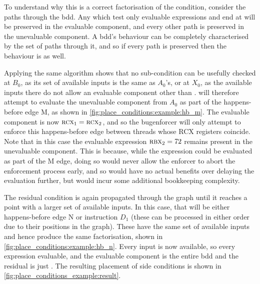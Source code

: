 To understand why this is a correct factorisation of the condition,
consider the paths through the \protect\gls{bdd}.  Any which test only
evaluable expressions and end at \false will be preserved in the
evaluable component, and every other path is preserved in the
unevaluable component.  A \protect\gls{bdd}'s behaviour can be
completely characterised by the set of paths through it, and so if
every path is preserved then the behaviour is as well.

Applying the same algorithm shows that no sub-condition can be
usefully checked at $B_0$, as its set of available inputs is the same
as $A_0$'s, or at $X_0$, as the available inputs there do not allow an
evaluable component other than \true.  {\Technique} will therefore
attempt to evaluate the unevaluable component from $A_0$ as part of
the happens-before edge M, as shown in
\autoref{fig:place_conditions:example:hb_m}.  The evaluable component
is now $\textsc{rcx}_1 = \textsc{rcx}_2$, and so the \gls{bugenforcer}
will only attempt to enforce this happens-before edge between threads
whose RCX registers coincide.  Note that in this case the
evaluable expression $\textsc{rbx}_2 = 72$ remains present in the
unevaluable component.  This is because, while the expression could be
evaluated as part of the M edge, doing so would never allow the
enforcer to abort the enforcement process early, and so would have no
actual benefits over delaying the evaluation further, but would incur
some additional bookkeeping complexity.

The residual condition is again propagated through the graph until it
reaches a point with a larger set of available inputs.  In this case,
that will be either happens-before edge N or instruction $D_1$ (these
can be processed in either order due to their positions in the graph).
These have the same set of available inputs and hence produce the same
factorisation, shown in \autoref{fig:place_conditions:example:hb_n}.
Every input is now available, so every expression evaluable, and the
evaluable component is the entire \gls{bdd} and the residual is just
{\true}.  The resulting placement of side conditions is shown in
\autoref{fig:place_conditions_example:result}.

